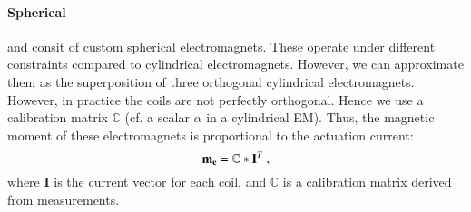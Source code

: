     
    
    
\paragraph{Spherical}
    \omniHap and \omniUIST consit of custom spherical electromagnets. These operate under different constraints compared to cylindrical electromagnets. However, we can approximate them as the superposition of three orthogonal cylindrical electromagnets. However, in practice the coils are not perfectly orthogonal. Hence we use a calibration matrix $\mathbb{C}$ (cf. a scalar $\alpha$ in a cylindrical EM). Thus, the magnetic moment of these electromagnets is proportional to the actuation current:
    \begin{equation}\label{eq:me_from_c_i}
    \mathbf{m_{e}} = \mathbb{C} * \mathbf{I}^T \ ,
    \end{equation}
    \noindent where $\mathbf{I}$ is the current vector for each coil, and $\mathbb{C}$ is a calibration matrix derived from measurements.

